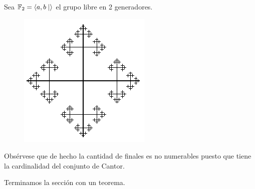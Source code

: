 \documentclass[twoside, 11pt]{article}
\begin{document}
\begin{ej}
Sea $\mathbb{F}_2=\langle{a,b\mid}\rangle$ el grupo libre en 2 generadores.

\begin{figure}[h!]
\includegraphics[scale=0.7]{cover}
\end{figure}
Obsérvese que de hecho la cantidad de finales es no numerables puesto que tiene la cardinalidad del conjunto de Cantor. 
\end{ej}

Terminamos la sección con un teorema.
\end{document}
